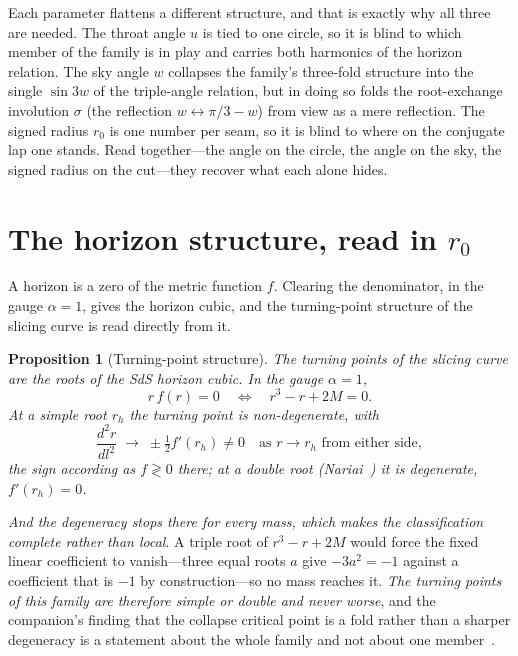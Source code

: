\documentclass[11pt,a4paper]{article}
\newtheorem{proposition}[theorem]{Proposition}
\theoremstyle{definition}
\begin{document}
Each parameter flattens a different structure, and that is exactly why all three are needed. The throat angle $u$ is tied to one circle, so it is blind to which member of the family is in play and carries both harmonics of the horizon relation. The sky angle $w$ collapses the family's three-fold structure into the single $\sin 3w$ of the triple-angle relation, but in doing so folds the root-exchange involution $\sigma$ (the reflection $w\leftrightarrow\pi/3-w$) from view as a mere reflection. The signed radius $r_{0}$ is one number per seam, so it is blind to where on the conjugate lap one stands. Read together---the angle on the circle, the angle on the sky, the signed radius on the cut---they recover what each alone hides.

\section{The horizon structure, read in $r_{0}$}\label{sec:cubic}

A horizon is a zero of the metric function $f$. Clearing the denominator, in the gauge $\alpha=1$, gives the horizon cubic, and the turning-point structure of the slicing curve is read directly from it.

\begin{proposition}[Turning-point structure]\label{prop:turning}
The turning points of the slicing curve are the roots of the SdS horizon cubic. In the gauge $\alpha=1$,
\begin{equation}\label{eq:cubic}
  r\,f(r)=0
  \quad\Longleftrightarrow\quad
  r^{3}-r+2M=0 .
\end{equation}
At a simple root $r_{h}$ the turning point is non-degenerate, with
\begin{equation}
  \frac{d^{2}r}{dl^{2}}\;\longrightarrow\;\pm\tfrac12 f'(r_{h})\neq0
  \quad\text{as } r\to r_{h}\text{ from either side},
\end{equation}
the sign according as $f\gtrless0$ there;
at a double root (Nariai~\cite{Nariai1951}) it is degenerate, $f'(r_{h})=0$.
\end{proposition}

\emph{And the degeneracy stops there for every mass, which makes the classification complete rather than
local}. A triple root of $r^{3}-r+2M$ would force the fixed linear coefficient
to vanish---three equal roots $a$ give $-3a^{2}=-1$ against a coefficient that is $-1$ by construction---so
no mass reaches it. \emph{The turning points of this family are therefore simple or double and never worse},
and the companion's finding that the collapse critical point is a fold rather than a sharper degeneracy is a
statement about the whole family and not about one member~\cite{JanzenCircle}.
\end{document}
